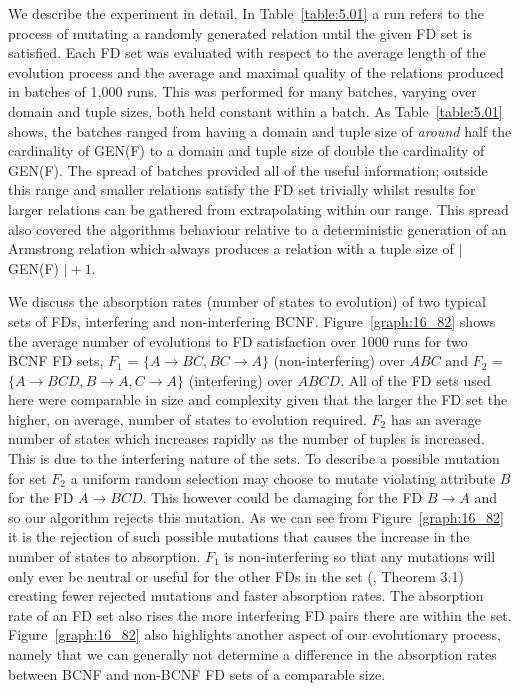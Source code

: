 We describe the experiment in detail. In Table~\ref{table:5.01} a
run refers to the process of mutating
a randomly generated relation until the given FD set is satisfied.
 Each FD set was evaluated with respect to the average length of the
 evolution process and the average and maximal quality of the relations
 produced in batches of 1,000 runs.
This was performed for many batches, varying over domain and tuple
sizes, both held constant within a batch. As Table~\ref{table:5.01} 
shows, the batches ranged from having a domain and tuple size
of {\em around} half the cardinality of GEN(F) to
a domain and tuple size of double the cardinality of GEN(F).
  The spread of batches provided all of the useful
information; outside this range and smaller relations satisfy the
FD set trivially whilst results for larger relations can be gathered
from extrapolating within our range. This spread also covered the
algorithms behaviour relative to a deterministic generation
of an Armstrong relation which always produces a relation with
a tuple size of $\mid$ GEN(F) $\mid + 1$.
\medskip

We discuss the absorption rates (number of states to
evolution) of two typical sets of FDs, 
interfering and non-interfering BCNF. Figure~\ref{graph:16_82}
shows the average number of evolutions to FD satisfaction over 1000 runs for
two BCNF FD sets, $F_1$ = $\{ A \to BC, BC \to A \}$ (non-interfering)
over $ABC$ and 
$F_2$ = $\{ A \to BCD, B \to A, C \to A \}$ (interfering) over $ABCD$.
  All of the
FD sets used here were comparable in size and complexity given that the larger
the FD set the higher, on average, number of states to evolution required.
$F_2$ has an average number of states which increases
rapidly as the number of tuples is increased. This is due to the
interfering nature of the sets. To describe a possible mutation
for set $F_2$ a uniform random selection may choose to mutate violating
attribute $B$ for the FD $A \to BCD$. This however could be damaging for
the FD $B \to A$ and so our algorithm rejects this mutation. As we
can see from Figure~\ref{graph:16_82} it is the rejection of such
possible mutations that causes the increase in the number of states
to absorption. $F_1$ is non-interfering so that
any mutations will only ever be neutral or useful for the other FDs in the set 
(\cite{cl96}, Theorem 3.1) creating fewer rejected mutations
and faster absorption rates. The absorption rate of an FD set also
rises the more interfering FD pairs there are within
the set.
Figure~\ref{graph:16_82}  also highlights another
aspect of our evolutionary process, namely that we can generally not determine
 a difference in the 
absorption rates between BCNF and non-BCNF FD sets of a comparable
size. \\

